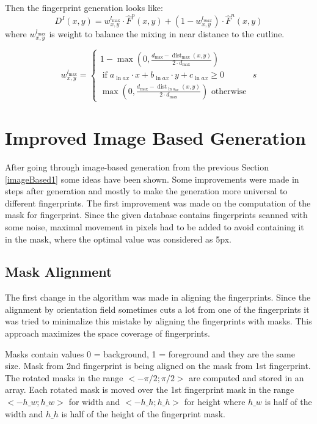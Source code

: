 Then the fingerprint generation looks like: \cite{morphing_paper}
\begin{equation}
    D^{I}(x, y)=w_{x, y}^{l_{\max }} \cdot \hat{F}^{p}(x, y)+\left(1-w_{x, y}^{l_{m a x}}\right) \cdot \hat{F}^{n}(x, y)
\end{equation}
where $w_{x, y}^{l_{\max }}$ is weight to balance the mixing in near distance to the cutline. \cite{morphing_paper}
    
\begin{equation}
    w_{x, y}^{l_{\max }}=\left\{\begin{array}{c}
    1-\max \left(0, \frac{d_{\max }-\operatorname{dist}_{\max }(x, y)}{2 \cdot d_{\max }}\right) \\
    \operatorname{if} a_{\ln a x} \cdot x+b_{\ln a x} \cdot y+c_{\ln a x} \geq 0 \\
    \max \left(0, \frac{d_{\max }-\operatorname{dist}_{\ln a_{a x}}(x, y)}{2 \cdot d_{\max }}\right) \text { otherwise }
    \end{array}\right.s
\end{equation}

\label{imageBased2}
\section{Improved Image Based Generation}
After going through image-based generation from the previous Section \ref{imageBased1} some ideas have been shown. Some improvements were made in steps after generation and mostly to make the generation more universal to different fingerprints. The first improvement was made on the computation of the mask for fingerprint. Since the given database contains fingerprints scanned with some noise, maximal movement in pixels had to be added to avoid containing it in the mask, where the optimal value was considered as 5px.

\subsection{Mask Alignment}
The first change in the algorithm was made in aligning the fingerprints. Since the alignment by orientation field sometimes cuts a lot from one of the fingerprints it was tried to minimalize this mistake by aligning the fingerprints with masks. This approach maximizes the space coverage of fingerprints.

Masks contain values 0 = background, 1 = foreground and they are the same size. Mask from 2nd fingerprint is being aligned on the mask from 1st fingerprint. The rotated masks in the range $ <-\pi/2; \pi/2>$ are computed and stored in an array. Each rotated mask is moved over the 1st fingerprint mask in the range  $ <-h\_w; h\_w>$ for width and $ <-h\_h; h\_h>$ for height where $h\_w$ is half of the width and $h\_h$ is half of the height of the fingerprint mask.

